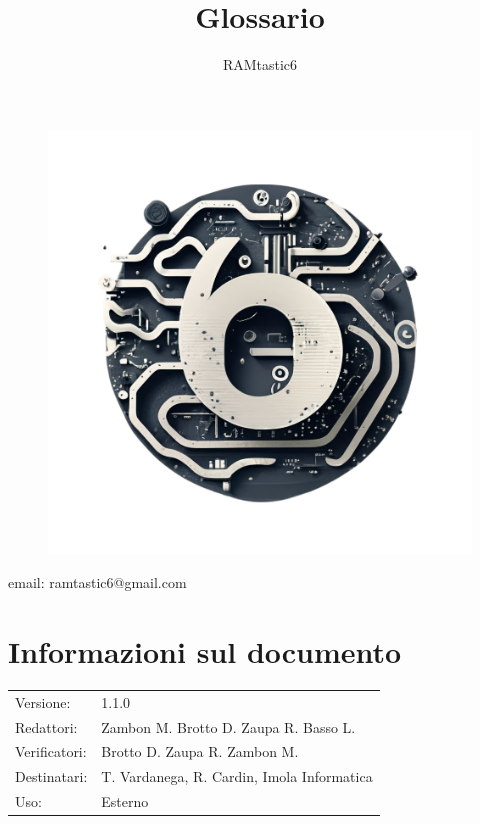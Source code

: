 \documentclass[12pt, oneside]{article}
\author{RAMtastic6}
\begin{document}
\thispagestyle{empty}
\title{Glossario}
\maketitle
\begin{figure}[h]
  \centering
  \includegraphics[scale=0.3]{logo.png}
\end{figure}
\begin{center}
    email: ramtastic6@gmail.com
\end{center}

\section*{Informazioni sul documento}
\begin{tabular}{ll}
Versione: & 1.1.0 \\
Redattori:  & Zambon M. Brotto D. Zaupa R. Basso L.\\
Verificatori: & Brotto D. Zaupa R. Zambon M.\\ 
Destinatari: & T. Vardanega, R. Cardin, Imola Informatica \\
Uso: & Esterno
\end{tabular}
\newpage

\end{document}
